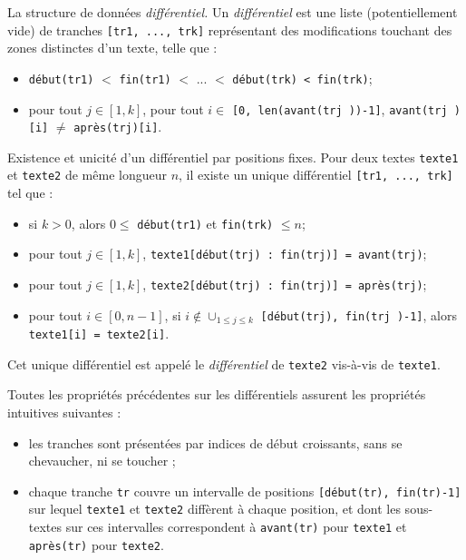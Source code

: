 \begin{defi}{La structure de données \textit{différentiel.}} Un \textit{différentiel} est une liste (potentiellement vide)
de tranches \lstinline{[tr1, ..., trk]} représentant des modifications touchant des zones distinctes d'un
texte, telle que :
\begin{itemize}[label=$\bullet$]
\item \lstinline{début(tr1)} $<$ \lstinline{fin(tr1)} $<$ ... $<$ \lstinline{début(trk) < fin(trk)};
\item pour tout $j \in [1, k]$, pour tout $i \in$ \lstinline{[0, len(avant(trj ))-1]}, \lstinline{avant(trj )[i]} $\neq$ \lstinline{après(trj)[i]}.  
\end{itemize}
\end{defi}

\begin{prop}{Existence et unicité d'un différentiel par positions fixes.} Pour deux textes \lstinline{texte1} et
\lstinline{texte2} de même longueur $n$, il existe un unique différentiel \lstinline{[tr1, ..., trk]} tel que :
\begin{itemize}
\item si $k > 0$, alors $0 \leq$ \lstinline{début(tr1)} et \lstinline{fin(trk)} $\leq n $;
\item pour tout $j \in [1, k]$, \lstinline{texte1[début(trj) : fin(trj)] = avant(trj)};
\item pour tout $j \in [1, k]$, \lstinline{texte2[début(trj) : fin(trj)] = après(trj)};
\item pour tout $i \in [0, n-1]$, si $i \notin \cup_{1\leq j \leq k}$
\lstinline{[début(trj), fin(trj )-1]}, alors \lstinline{texte1[i] = texte2[i]}.
\end{itemize}
\end{prop}

Cet unique différentiel est appelé le \textit{différentiel} de \lstinline{texte2} vis-à-vis de \lstinline{texte1}.

Toutes les propriétés précédentes sur les différentiels assurent les propriétés intuitives suivantes :
\begin{itemize}
\item les tranches sont présentées par indices de début croissants, sans se chevaucher, ni se toucher ;
\item chaque tranche \lstinline{tr} couvre un intervalle de positions \lstinline{[début(tr), fin(tr)-1]} sur lequel 
\lstinline{texte1} et \lstinline{texte2} diffèrent à chaque position, et dont les sous-textes sur ces intervalles
correspondent à \lstinline{avant(tr)} pour \lstinline{texte1} et \lstinline{après(tr)} pour \lstinline{texte2}.
\end{itemize}



